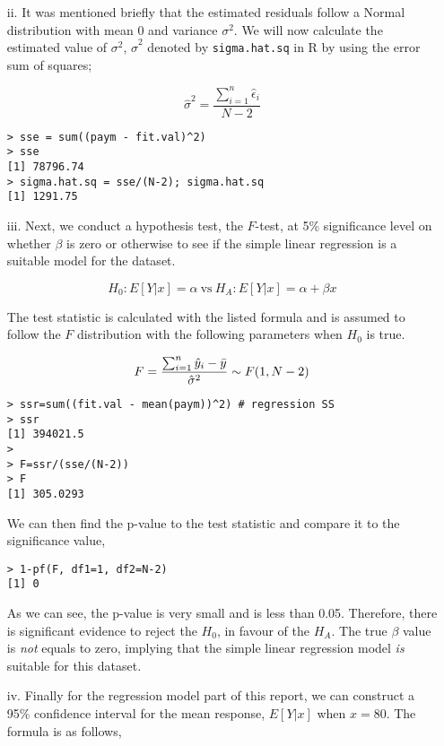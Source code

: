 \documentclass[11pt,a4]{article}
\begin{document}
\begin{itemize}
\begin{itemize}
    \item [ii.]
It was mentioned briefly that the estimated residuals follow a Normal distribution with mean 0 and variance $\sigma^2$. We will now calculate the estimated value of $\sigma^2$, $\hat{\sigma}^2$ denoted by \verb|sigma.hat.sq| in R by using the error sum of squares;

\[ \hat{\sigma}^2 = \frac{\sum_{i=1}^{n} \hat{\epsilon}_{i}}{N-2} \]

    \begin{verbatim}
> sse = sum((paym - fit.val)^2)
> sse
[1] 78796.74
> sigma.hat.sq = sse/(N-2); sigma.hat.sq
[1] 1291.75
    \end{verbatim}
    
    \item[iii.]
Next, we conduct a hypothesis test, the $F$-test, at 5\% significance level on whether $\beta$ is zero or otherwise to see if the simple linear regression is a suitable model for the dataset. 

\[ H_{0} : E[Y|x] = \alpha \: \mbox{vs} \: H_{A} : E[Y|x] = \alpha + \beta x \]

The test statistic is calculated with the listed formula and is assumed to follow the $F$ distribution with the following parameters when $H_{0}$ is true.

\[ F = \frac{\sum_{i=1}^{n} \hat{y}_{i} - \Bar{y}}{\hat{\sigma}^2} \sim F(1, N-2)\]

    \begin{verbatim}
> ssr=sum((fit.val - mean(paym))^2) # regression SS
> ssr
[1] 394021.5
> 
> F=ssr/(sse/(N-2))
> F
[1] 305.0293
    \end{verbatim}
    
We can then find the p-value to the test statistic and compare it to the significance value,

   \begin{verbatim}
> 1-pf(F, df1=1, df2=N-2)
[1] 0
   \end{verbatim}
   
As we can see, the p-value is very small and is less than 0.05. Therefore, there is significant evidence to reject the $H_{0}$, in favour of the $H_{A}$. The true $\beta$ value is \emph{not} equals to zero, implying that the simple linear regression model \emph{is} suitable for this dataset.
    
    \item[iv.]
Finally for the regression model part of this report, we can construct a 95\% confidence interval for the mean response, $E[Y|x]$ when $x = 80$. The formula is as follows,


\end{itemize}
\end{itemize}
\end{document}
